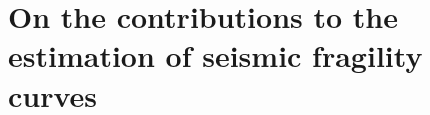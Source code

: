 

















\section{On the contributions to the estimation of seismic fragility curves}\label{sec:concl:frags}






